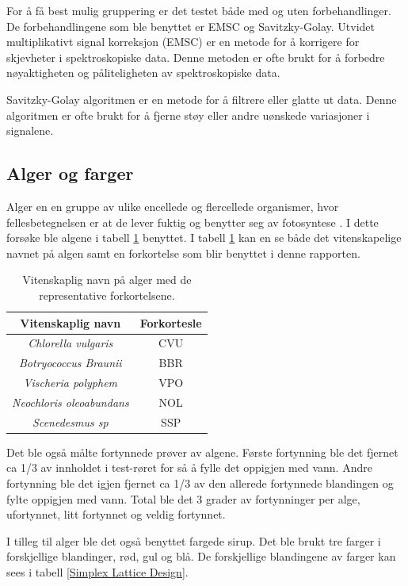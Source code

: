\documentclass[twocolumn, 11pt]{article} %
\begin{document}
For å få best mulig gruppering er det testet både med og uten forbehandlinger. De forbehandlingene som ble benyttet er EMSC og Savitzky-Golay.  
Utvidet multiplikativt signal korreksjon (EMSC) er en metode for å korrigere for skjevheter i spektroskopiske data. Denne metoden er ofte brukt for å forbedre nøyaktigheten og påliteligheten av spektroskopiske data\cite{oppgavetekst}.

Savitzky-Golay algoritmen er en metode for å filtrere eller glatte ut data. Denne algoritmen er ofte brukt for å fjerne støy eller andre uønskede variasjoner i signalene\cite{oppgavetekst}.


\subsection{Alger og farger}
Alger en en gruppe av ulike encellede og flercellede organismer, hvor fellesbetegnelsen er at de lever fuktig og benytter seg av fotosyntese \cite{Alger}. I dette forsøke ble algene i tabell \ref{table:1} benyttet. I tabell \ref{table:1} kan en se både det vitenskapelige navnet på algen samt en forkortelse som blir benyttet i denne rapporten.

\begin{table}[H]
\begin{tabular}{|c|c|} 
\hline
Vitenskaplig navn & Forkortesle \\
\hline
\textit{Chlorella vulgaris} & CVU \\
\textit{Botryococcus Braunii} & BBR\\ 
\textit{Vischeria polyphem} & VPO \\ 
\textit{Neochloris oleoabundans} & NOL \\
\textit{Scenedesmus sp} & SSP\\
\hline
\end{tabular}
\caption{Vitenskaplig navn på alger med de representative forkortelsene.}
\label{table:1}
\end{table}


Det ble også målte fortynnede prøver av algene. Første fortynning ble det fjernet ca 1/3 av innholdet i test-røret for så å fylle det oppigjen med vann. Andre fortynning ble det igjen fjernet ca 1/3 av den allerede fortynnede blandingen og fylte oppigjen med vann. Total ble det 3 grader av fortynninger per alge, ufortynnet, litt fortynnet og veldig fortynnet.

I tilleg til alger ble det også benyttet fargede sirup. Det ble brukt tre farger i forskjellige blandinger, rød, gul og blå. De forskjellige blandingene av farger kan sees i tabell \ref{Simplex Lattice Design}. 
\end{document}
